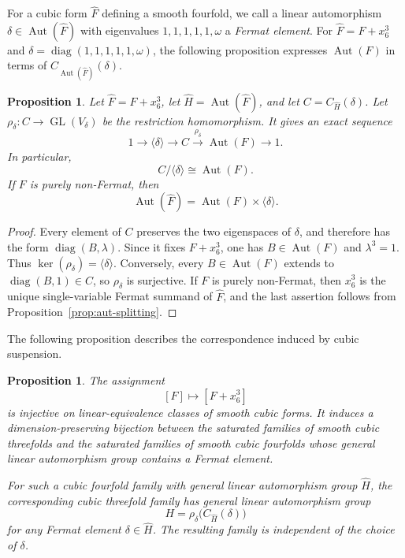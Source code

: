 \documentclass[12pt]{amsart}
\numberwithin{equation}{section}
\theoremstyle{plain}
\newtheorem{prop}[thm]{Proposition}
\theoremstyle{definition}
\theoremstyle{remark}
\DeclareMathOperator{\Aut}{Aut}
\DeclareMathOperator{\GL}{GL}
\DeclareMathOperator{\diag}{diag}
\begin{document}
For a cubic form \(\widehat F\) defining a smooth fourfold, we call a linear
automorphism \(\delta\in\Aut(\widehat F)\) with eigenvalues
\(1,1,1,1,1,\omega\) a \emph{Fermat element}.
For \(\widehat F=F+x_6^3\) and
\(\delta=\diag(1,1,1,1,1,\omega)\), the following proposition expresses
\(\Aut(F)\) in terms of \(C_{\Aut(\widehat F)}(\delta)\).

\begin{prop}\label{prop:threefold-centralizer}
Let \(\widehat F=F+x_6^3\), let
\(\widehat H=\Aut(\widehat F)\), and let
\(C=C_{\widehat H}(\delta)\).  Let
\(\rho_\delta:C\to\GL(V_\delta)\) be the restriction homomorphism.  It gives
an exact
sequence
\[
 1\longrightarrow\langle\delta\rangle\longrightarrow C
 \overset{\rho_\delta}{\longrightarrow}\Aut(F)\longrightarrow1.
\]
In particular,
\[
 C/\langle\delta\rangle\cong\Aut(F).
\]
If \(F\) is purely non-Fermat, then
\[
 \Aut(\widehat F)=\Aut(F)\times\langle\delta\rangle.
\]
\end{prop}

\begin{proof}
Every element of \(C\) preserves the two eigenspaces of \(\delta\), and
therefore has the form \(\diag(B,\lambda)\).  Since it fixes
\(F+x_6^3\), one has \(B\in\Aut(F)\) and \(\lambda^3=1\).  Thus
\(\ker(\rho_\delta)=\langle\delta\rangle\).  Conversely, every
\(B\in\Aut(F)\) extends to \(\diag(B,1)\in C\), so \(\rho_\delta\) is
surjective.  If \(F\) is purely non-Fermat, then \(x_6^3\) is the unique
single-variable Fermat summand of \(\widehat F\), and the last assertion follows
from Proposition~\ref{prop:aut-splitting}.
\end{proof}

The following proposition describes the correspondence induced by cubic suspension.

\begin{prop}\label{prop:threefold-suspension-map}
The assignment
\[
 [F]\longmapsto[F+x_6^3]
\]
is injective on linear-equivalence classes of smooth cubic forms.
It induces a dimension-preserving bijection between the saturated families
of smooth cubic threefolds and the saturated families of smooth cubic
fourfolds whose general linear automorphism group contains a Fermat element.

For such a cubic fourfold family with general linear automorphism group
\(\widehat H\), the corresponding cubic threefold family has general
linear automorphism group
\[
 H=\rho_\delta\bigl(C_{\widehat H}(\delta)\bigr)
\]
for any Fermat element \(\delta\in\widehat H\).  The resulting family is
independent of the choice of \(\delta\).
\end{prop}
\end{document}
